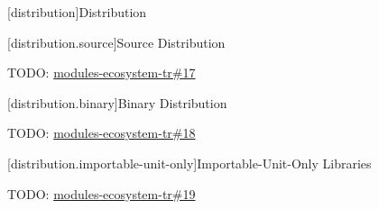 
[distribution]{Distribution}

%

[distribution.source]{Source Distribution}

\pnum TODO: \href{https://github.com/cplusplus/modules-ecosystem-tr/issues/17}{modules-ecosystem-tr\#17}

[distribution.binary]{Binary Distribution}

\pnum TODO: \href{https://github.com/cplusplus/modules-ecosystem-tr/issues/18}{modules-ecosystem-tr\#18}

[distribution.importable-unit-only]{Importable-Unit-Only Libraries}

\pnum TODO: \href{https://github.com/cplusplus/modules-ecosystem-tr/issues/19}{modules-ecosystem-tr\#19}

%

